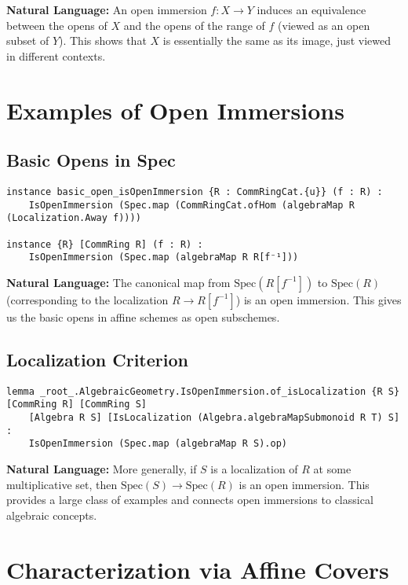\documentclass{article}
\theoremstyle{definition}
\begin{document}
\textbf{Natural Language:} An open immersion $f: X \to Y$ induces an equivalence between the opens of $X$ and the opens of the range of $f$ (viewed as an open subset of $Y$). This shows that $X$ is essentially the same as its image, just viewed in different contexts.

\section{Examples of Open Immersions}

\subsection{Basic Opens in Spec}

\begin{lstlisting}
instance basic_open_isOpenImmersion {R : CommRingCat.{u}} (f : R) :
    IsOpenImmersion (Spec.map (CommRingCat.ofHom (algebraMap R (Localization.Away f))))

instance {R} [CommRing R] (f : R) :
    IsOpenImmersion (Spec.map (algebraMap R R[f⁻¹]))
\end{lstlisting}

\textbf{Natural Language:} The canonical map from $\mathrm{Spec}(R[f^{-1}])$ to $\mathrm{Spec}(R)$ (corresponding to the localization $R \to R[f^{-1}]$) is an open immersion. This gives us the basic opens in affine schemes as open subschemes.

\subsection{Localization Criterion}

\begin{lstlisting}
lemma _root_.AlgebraicGeometry.IsOpenImmersion.of_isLocalization {R S} [CommRing R] [CommRing S]
    [Algebra R S] [IsLocalization (Algebra.algebraMapSubmonoid R T) S] :
    IsOpenImmersion (Spec.map (algebraMap R S).op)
\end{lstlisting}

\textbf{Natural Language:} More generally, if $S$ is a localization of $R$ at some multiplicative set, then $\mathrm{Spec}(S) \to \mathrm{Spec}(R)$ is an open immersion. This provides a large class of examples and connects open immersions to classical algebraic concepts.

\section{Characterization via Affine Covers}
\end{document}
